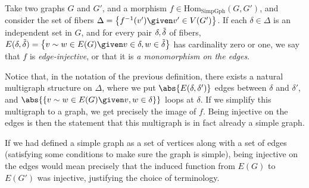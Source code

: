 \documentclass[a4paper,reqno,oneside]{article} %
\begin{document}
\begin{definition}
Take two graphs $G$ and $G'$, and a morphism $f \in \mathrm{Hom}_{\mathrm{SimpGph}}(G, G')$, and consider the set of fibers $\Delta = \left\{f^{-1}(v')\given v' \in V(G')\right\}$. If each $\delta \in \Delta$ is an independent set in $G$, and for every pair $\delta, \Tilde{\delta}$ of fibers, $E(\delta,\Tilde{\delta}) = \left\{v \sim w \in E(G) \given v \in \delta, w \in \Tilde{\delta}\right\}$ has cardinality zero or one, we say that $f$ is \emph{edge-injective}, or that it is \emph{a monomorphism on the edges}.
\end{definition}

\begin{remark}
Notice that, in the notation of the previous definition, there exists a natural multigraph structure on $\Delta$, where we put $\abs{E(\delta,\delta')}$ edges between $\delta$ and $\delta'$, and $\abs{\left\{v \sim w \in E(G) \given v, w \in \delta\right\}}$ loops at $\delta$. If we simplify this multigraph to a graph, we get precisely the image of $f$. Being injective on the edges is then the statement that this multigraph is in fact already a simple graph.

If we had defined a simple graph as a set of vertices along with a set of edges (satisfying some conditions to make sure the graph is simple), being injective on the edges would mean precisely that the induced function from $E(G)$ to $E(G')$ was injective, justifying the choice of terminology.
\end{remark}
\end{document}
